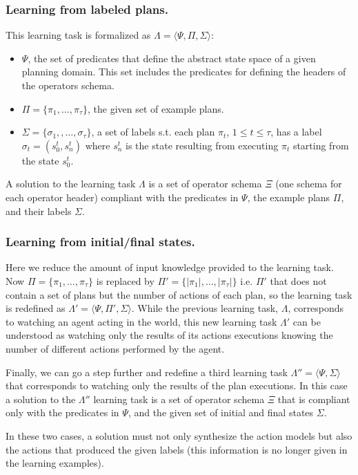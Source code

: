 \documentclass[letterpaper]{article} %
\newcommand{\tup}[1]{{\langle #1 \rangle}}
\begin{document}
\subsubsection{Learning from labeled plans.}
This learning task is formalized as $\Lambda=\tup{\Psi,\Pi,\Sigma}$: 
\begin{itemize}
\item $\Psi$, the set of predicates that define the abstract state space of a given planning domain. This set includes the predicates for defining the headers of the operators schema.
\item $\Pi=\{\pi_1,\ldots,\pi_{\tau}\}$, the given set of example plans.
\item $\Sigma=\{\sigma_1,,\ldots,\sigma_{\tau}\}$, a set of labels s.t. each plan $\pi_t$, {\small $1\leq t\leq \tau$}, has a label $\sigma_t=(s_0^t,s_{n}^t)$ where $s_{n}^t$ is the state resulting from executing $\pi_t$ starting from the state $s_0^t$. 
\end{itemize}

A solution to the learning task $\Lambda$ is a set of operator schema $\Xi$ (one schema for each operator header) compliant with the predicates in $\Psi$, the example plans $\Pi$, and their labels $\Sigma$.

\subsubsection{Learning from initial/final states.}
Here we reduce the amount of input knowledge provided to the learning task. Now $\Pi=\{\pi_1,\ldots,\pi_{\tau}\}$ is replaced by  $\Pi'=\{|\pi_1|,\ldots,|\pi_{\tau}|\}$ i.e. $\Pi'$ that does not contain a set of plans but the number of actions of each plan, so the learning task is redefined as $\Lambda'=\tup{\Psi,\Pi',\Sigma}$. While the previous learning task, $\Lambda$, corresponds to watching an agent acting in the world, this new learning task $\Lambda'$ can be understood as watching only the results of its actions executions knowing the number of different actions performed by the agent.

Finally, we can go a step further and redefine a third learning task $\Lambda''=\tup{\Psi,\Sigma}$ that corresponds to watching only the results of the plan executions. In this case a solution to the $\Lambda''$ learning task is a set of operator schema $\Xi$ that is compliant only with the predicates in $\Psi$, and the given set of initial and final states $\Sigma$.

In these two cases, a solution must not only synthesize the action models but also the actions that produced the given labels (this information is no longer given in the learning examples).
\end{document}

